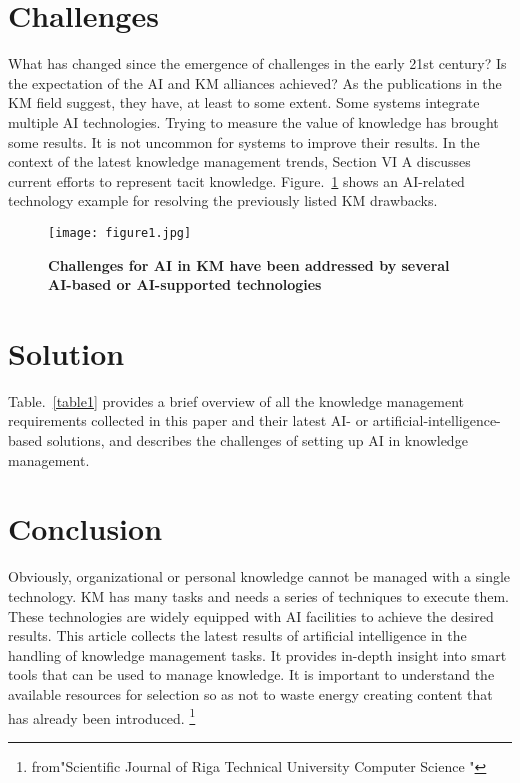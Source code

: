 \documentclass[a4paper,12pt,twocolumn]{article}
\begin{document}
\section{Challenges} 
What has changed since the emergence of challenges in the early 21st century? Is the expectation of the AI ​​and KM alliances achieved? As the publications in the KM field suggest, they have, at least to some extent. Some systems integrate multiple AI technologies. Trying to measure the value of knowledge has brought some results. It is not uncommon for systems to improve their results. In the context of the latest knowledge management trends, Section VI A discusses current efforts to represent tacit knowledge. Figure.~\ref{pic1} shows an AI-related technology example for resolving the previously listed KM drawbacks.
\begin{figure}[htp]
	\centering
	\texttt{[image: figure1.jpg]}
	\caption{\bfseries{  Challenges for AI in KM have been addressed by several AI-based or AI-supported technologies  }}\label{pic1}
\end{figure}
\section{Solution}
Table.~\ref{table1} provides a brief overview of all the knowledge management requirements collected in this paper and their latest AI- or artificial-intelligence-based solutions, and describes the challenges of setting up AI in knowledge management.

\section{Conclusion}
Obviously, organizational or personal knowledge cannot be managed with a single technology. KM has many tasks and needs a series of techniques to execute them. These technologies are widely equipped with AI facilities to achieve the desired results. This article collects the latest results of artificial intelligence in the handling of knowledge management tasks. It provides in-depth insight into smart tools that can be used to manage knowledge. It is important to understand the available resources for selection so as not to waste energy creating content that has already been introduced.
		\footnote{from"Scientific Journal of Riga Technical University Computer Science	"} 

%
 
\end{document}
